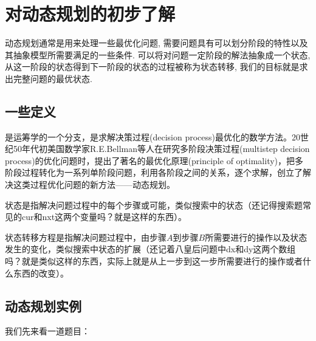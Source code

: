\section{对动态规划的初步了解}
动态规划通常是用来处理一些最优化问题, 需要问题具有可以划分阶段的特性以及其抽象模型所需要满足的一些条件.
可以将对问题一定阶段的解法抽象成一个状态, 从这一阶段的状态得到下一阶段的状态的过程被称为状态转移, 我们的目标就是求出完整问题的最优状态.
\subsection{一些定义}
\begin{definition}是运筹学的一个分支，是求解决策过程(decision process)最优化的数学方法。20世纪50年代初美国数学家R.E.Bellman等人在研究多阶段决策过程(multistep decision process)的优化问题时，提出了著名的最优化原理(principle of optimality)，把多阶段过程转化为一系列单阶段问题，利用各阶段之间的关系，逐个求解，创立了解决这类过程优化问题的新方法——动态规划。
\end{definition}
\begin{definition}[状态]
	状态是指解决问题过程中的每个步骤或可能，类似搜索中的状态（还记得搜索题常见的cur和nxt这两个变量吗？就是这样的东西）。
\end{definition}
\begin{definition}[状态转移方程]
	状态转移方程是指解决问题过程中，由步骤$A$到步骤$B$所需要进行的操作以及状态发生的变化，类似搜索中状态的扩展（还记着八皇后问题中dx和dy这两个数组吗？就是类似这样的东西，实际上就是从上一步到这一步所需要进行的操作或者什么东西的改变）。
\end{definition}

\subsection{动态规划实例}
我们先来看一道题目：

